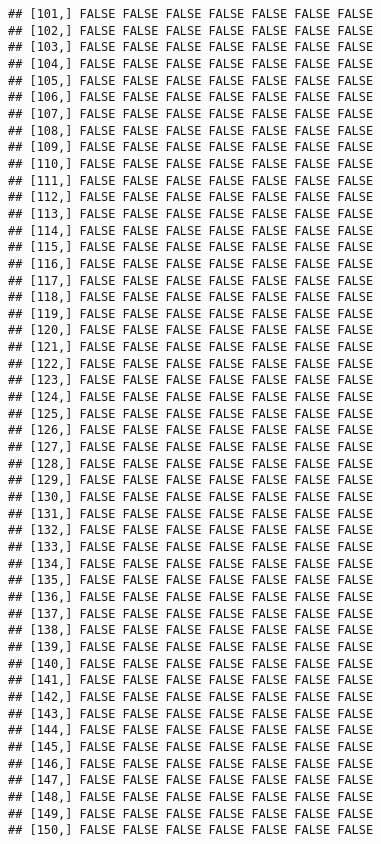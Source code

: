 \documentclass[
]{article}
\begin{document}
\begin{verbatim}
## [101,] FALSE FALSE FALSE FALSE FALSE FALSE FALSE
## [102,] FALSE FALSE FALSE FALSE FALSE FALSE FALSE
## [103,] FALSE FALSE FALSE FALSE FALSE FALSE FALSE
## [104,] FALSE FALSE FALSE FALSE FALSE FALSE FALSE
## [105,] FALSE FALSE FALSE FALSE FALSE FALSE FALSE
## [106,] FALSE FALSE FALSE FALSE FALSE FALSE FALSE
## [107,] FALSE FALSE FALSE FALSE FALSE FALSE FALSE
## [108,] FALSE FALSE FALSE FALSE FALSE FALSE FALSE
## [109,] FALSE FALSE FALSE FALSE FALSE FALSE FALSE
## [110,] FALSE FALSE FALSE FALSE FALSE FALSE FALSE
## [111,] FALSE FALSE FALSE FALSE FALSE FALSE FALSE
## [112,] FALSE FALSE FALSE FALSE FALSE FALSE FALSE
## [113,] FALSE FALSE FALSE FALSE FALSE FALSE FALSE
## [114,] FALSE FALSE FALSE FALSE FALSE FALSE FALSE
## [115,] FALSE FALSE FALSE FALSE FALSE FALSE FALSE
## [116,] FALSE FALSE FALSE FALSE FALSE FALSE FALSE
## [117,] FALSE FALSE FALSE FALSE FALSE FALSE FALSE
## [118,] FALSE FALSE FALSE FALSE FALSE FALSE FALSE
## [119,] FALSE FALSE FALSE FALSE FALSE FALSE FALSE
## [120,] FALSE FALSE FALSE FALSE FALSE FALSE FALSE
## [121,] FALSE FALSE FALSE FALSE FALSE FALSE FALSE
## [122,] FALSE FALSE FALSE FALSE FALSE FALSE FALSE
## [123,] FALSE FALSE FALSE FALSE FALSE FALSE FALSE
## [124,] FALSE FALSE FALSE FALSE FALSE FALSE FALSE
## [125,] FALSE FALSE FALSE FALSE FALSE FALSE FALSE
## [126,] FALSE FALSE FALSE FALSE FALSE FALSE FALSE
## [127,] FALSE FALSE FALSE FALSE FALSE FALSE FALSE
## [128,] FALSE FALSE FALSE FALSE FALSE FALSE FALSE
## [129,] FALSE FALSE FALSE FALSE FALSE FALSE FALSE
## [130,] FALSE FALSE FALSE FALSE FALSE FALSE FALSE
## [131,] FALSE FALSE FALSE FALSE FALSE FALSE FALSE
## [132,] FALSE FALSE FALSE FALSE FALSE FALSE FALSE
## [133,] FALSE FALSE FALSE FALSE FALSE FALSE FALSE
## [134,] FALSE FALSE FALSE FALSE FALSE FALSE FALSE
## [135,] FALSE FALSE FALSE FALSE FALSE FALSE FALSE
## [136,] FALSE FALSE FALSE FALSE FALSE FALSE FALSE
## [137,] FALSE FALSE FALSE FALSE FALSE FALSE FALSE
## [138,] FALSE FALSE FALSE FALSE FALSE FALSE FALSE
## [139,] FALSE FALSE FALSE FALSE FALSE FALSE FALSE
## [140,] FALSE FALSE FALSE FALSE FALSE FALSE FALSE
## [141,] FALSE FALSE FALSE FALSE FALSE FALSE FALSE
## [142,] FALSE FALSE FALSE FALSE FALSE FALSE FALSE
## [143,] FALSE FALSE FALSE FALSE FALSE FALSE FALSE
## [144,] FALSE FALSE FALSE FALSE FALSE FALSE FALSE
## [145,] FALSE FALSE FALSE FALSE FALSE FALSE FALSE
## [146,] FALSE FALSE FALSE FALSE FALSE FALSE FALSE
## [147,] FALSE FALSE FALSE FALSE FALSE FALSE FALSE
## [148,] FALSE FALSE FALSE FALSE FALSE FALSE FALSE
## [149,] FALSE FALSE FALSE FALSE FALSE FALSE FALSE
## [150,] FALSE FALSE FALSE FALSE FALSE FALSE FALSE

\end{verbatim}
\end{document}
